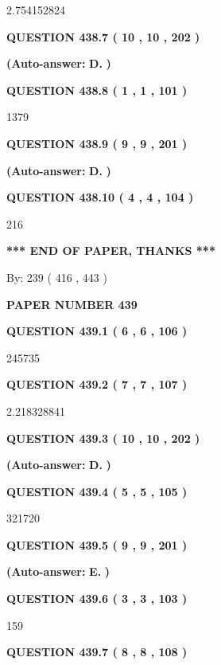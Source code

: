 \documentclass{ctexart}
\begin{document}
2.754152824
  
  
{\textbf{\large{QUESTION
438.7 
 ( 10 , 10 , 202 )
}}}
 
 
{\textbf{(Auto-answer:}}
{\textbf{\large{
D.}}}
{\textbf{)}}
 
 
  
  
{\textbf{\large{QUESTION
438.8 
 ( 1 , 1 , 101 )
}}}

1379
  
  
{\textbf{\large{QUESTION
438.9 
 ( 9 , 9 , 201 )
}}}
 
 
{\textbf{(Auto-answer:}}
{\textbf{\large{
D.}}}
{\textbf{)}}
 
 
  
  
{\textbf{\large{QUESTION
438.10 
 ( 4 , 4 , 104 )
}}}

216
   
   
   
   
\vspace{1.0in} 
{\textbf{\large{ *** END OF PAPER, THANKS *** }}} 
   
   
\hspace{1.0in} By: 
 239 ( 416 ,  443 )
   
   
   
   
\newpage 
\setcounter{page}{ 
   439001 } 
   
   
 {\textbf{ \Large{ PAPER NUMBER  439  }}}
   
   
   
   
  
  
{\textbf{\large{QUESTION
439.1 
 ( 6 , 6 , 106 )
}}}

245735
  
  
{\textbf{\large{QUESTION
439.2 
 ( 7 , 7 , 107 )
}}}

2.218328841
  
  
{\textbf{\large{QUESTION
439.3 
 ( 10 , 10 , 202 )
}}}
 
 
{\textbf{(Auto-answer:}}
{\textbf{\large{
D.}}}
{\textbf{)}}
 
 
  
  
{\textbf{\large{QUESTION
439.4 
 ( 5 , 5 , 105 )
}}}

321720
  
  
{\textbf{\large{QUESTION
439.5 
 ( 9 , 9 , 201 )
}}}
 
 
{\textbf{(Auto-answer:}}
{\textbf{\large{
E.}}}
{\textbf{)}}
 
 
  
  
{\textbf{\large{QUESTION
439.6 
 ( 3 , 3 , 103 )
}}}

159
  
  
{\textbf{\large{QUESTION
439.7 
 ( 8 , 8 , 108 )
}}}
\end{document}
